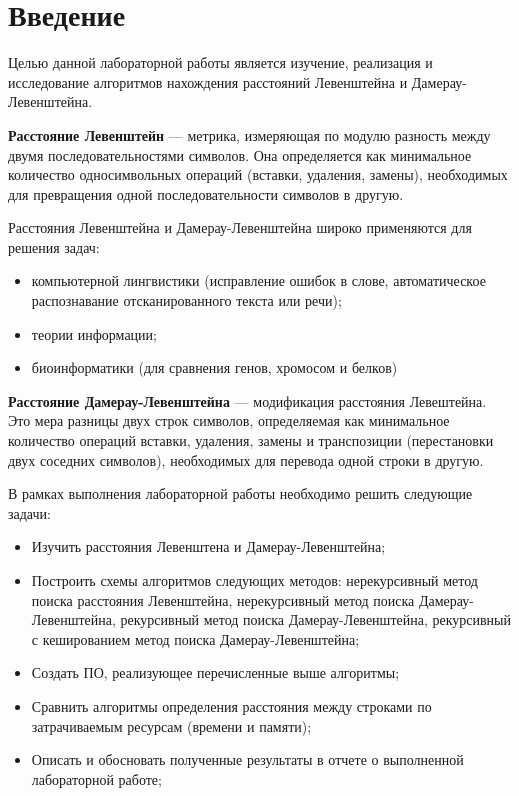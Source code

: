 \chapter*{Введение}

Целью данной лабораторной работы является изучение, реализация и исследование алгоритмов нахождения расстояний Левенштейна и Дамерау-Левенштейна.

\bigskip

\textbf{Расстояние Левенштейн} — метрика, измеряющая по модулю разность между двумя последовательностями символов. Она определяется как минимальное количество односимвольных операций (вставки, удаления, замены), необходимых для превращения одной последовательности символов в другую.

\bigskip

Расстояния Левенштейна и  Дамерау-Левенштейна широко применяются для решения задач:
\begin{itemize}
	\item компьютерной лингвистики (исправление ошибок в слове, автоматическое распознавание отсканированного текста или речи);
	\item теории информации;
	\item биоинформатики (для сравнения генов, хромосом и белков)
\end{itemize}

\textbf{Расстояние Дамерау-Левенштейна} — модификация расстояния Левештейна. Это мера разницы двух строк символов, определяемая как минимальное количество операций вставки, удаления, замены и транспозиции (перестановки двух соседних символов), необходимых для перевода одной строки в другую.

\bigskip

В рамках выполнения лабораторной работы необходимо решить следующие задачи:

\begin{itemize}
	\item Изучить расстояния Левенштена и Дамерау-Левенштейна;
	\item Построить схемы алгоритмов следующих методов: нерекурсивный метод поиска расстояния Левенштейна, нерекурсивный метод поиска Дамерау-Левенштейна, рекурсивный метод поиска Дамерау-Левенштейна, рекурсивный с кешированием метод поиска Дамерау-Левенштейна;
	\item Создать ПО, реализующее перечисленные выше алгоритмы;
	\item Сравнить алгоритмы определения расстояния между строками по затрачиваемым ресурсам (времени и памяти);
	\item Описать и обосновать полученные результаты в отчете о выполненной лабораторной работе;
\end{itemize}
